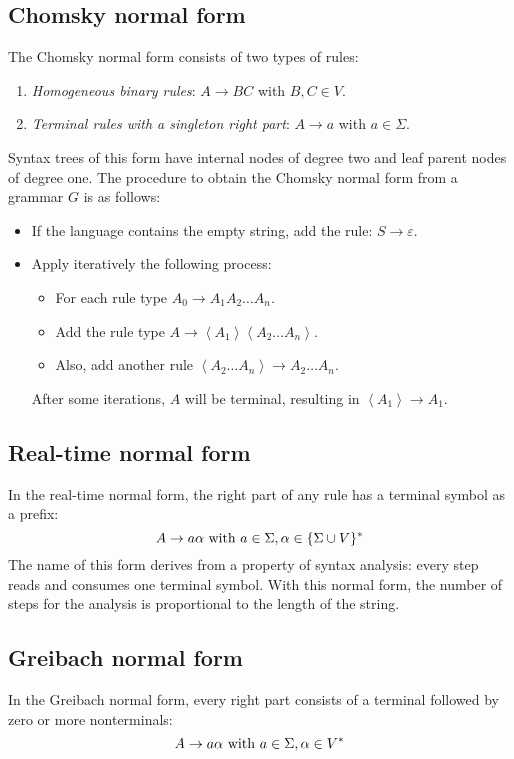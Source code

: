 \subsection{Chomsky normal form}
The Chomsky normal form consists of two types of rules:
\begin{enumerate}
    \item \textit{Homogeneous binary rules}: $A \rightarrow BC$ with $B,C \in V$.
    \item \textit{Terminal rules with a singleton right part}: $A \rightarrow a$ with $a \in \Sigma$.
\end{enumerate}
Syntax trees of this form have internal nodes of degree two and leaf parent nodes of degree one. 
The procedure to obtain the Chomsky normal form from a grammar $G$ is as follows:
\begin{itemize}
    \item If the language contains the empty string, add the rule: $S \rightarrow \varepsilon$.
    \item  Apply iteratively the following process:
        \begin{itemize}
            \item For each rule type $A_0 \rightarrow A_1A_2\dots A_n$.
            \item Add the rule type $A \rightarrow \left\langle A_1 \right\rangle\left\langle A_2\dots A_n\right\rangle$.
            \item Also, add another rule $\left\langle A_2\dots A_n\right\rangle \rightarrow A_2\dots A_n$.
        \end{itemize}
        After some iterations, $A$ will be terminal, resulting in $\left\langle A_1 \right\rangle \rightarrow A_1$.
\end{itemize}

\subsection{Real-time normal form}
In the real-time normal form, the right part of any rule has a terminal symbol as a prefix:
\[A \rightarrow a \alpha \textnormal{ with } a \in \Sigma, \alpha \in \{\Sigma \cup V\}^{\ast}\]
The name of this form derives from a property of syntax analysis: every step reads and consumes one terminal symbol. 
With this normal form, the number of steps for the analysis is proportional to the length of the string.

\subsection{Greibach normal form}
In the Greibach normal form, every right part consists of a terminal followed by zero or more nonterminals:
\[A \rightarrow a \alpha \textnormal{ with } a \in \Sigma, \alpha \in V^{\ast}\]